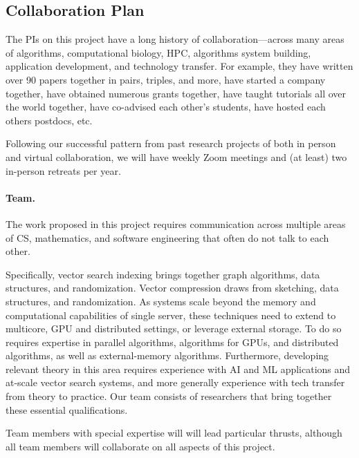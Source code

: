 

\thispagestyle{empty}

\subsection*{Collaboration Plan}

The PIs on this project have a long history of collaboration—across many areas of algorithms, computational biology, HPC, algorithms system building, application development, and technology transfer. For example, they have written over 90 papers together in pairs, triples, and more, have started a company together, have obtained numerous grants together, have taught tutorials all over the world together, have co-advised each other’s students, have hosted each others postdocs, etc.

Following our successful pattern from past research projects of both in person and virtual collaboration, we will have weekly Zoom meetings and (at least) two in-person retreats per year. 

\paragraph{Team.} The work proposed in this project requires communication across multiple areas of CS, mathematics, and software engineering that often do not talk to each other.

Specifically, vector search indexing brings together graph algorithms, data structures, and randomization. Vector compression draws from sketching, data structures, and randomization. As systems scale
beyond the memory and computational capabilities of single server, these techniques need to extend to
multicore, GPU and distributed settings, or leverage external storage. To do so requires expertise in parallel algorithms, algorithms for GPUs, and distributed algorithms, as well as external-memory algorithms.
Furthermore, developing relevant theory in this area requires experience with AI and ML applications and
at-scale vector search systems, and more generally experience with tech transfer from theory to practice.
Our team consists of researchers that bring together these essential qualifications.

Team members with special expertise will will lead particular thrusts, although all team members will collaborate on all aspects of this project.

